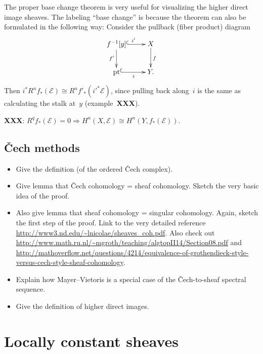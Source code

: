 \documentclass[10pt]{amsart}
\theoremstyle{definition}
\theoremstyle{plain}
\theoremstyle{remark}
\newcommand{\E}{\mathcal{E}}
\newcommand{\pt}{\mathrm{pt}}
\begin{document}
The proper base change theorem is very useful for visualizing the higher direct
image sheaves. The labeling ``base change'' is because the theorem can also be
formulated in the following way: Consider the pullback (fiber product) diagram
\[ \xymatrix{
  f^{-1}[y] \ar@{^{(}->}[r]^{i'} \ar[d]_{f'} & X \ar[d]^f \\
  \pt \ar@{^{(}->}[r]_i & Y.
} \]
Then $i^* R^n f_*(\E) \cong R^n f'_*(i'^*\E)$, since pulling back along~$i$ is
the same as calculating the stalk at~$y$ (example~\textbf{XXX}).

\textbf{XXX}: $R^q f_*(\E) = 0 \Rightarrow H^n(X,\E) \cong H^n(Y,f_*(\E))$.


\subsection{Čech methods}

\begin{itemize}
\item Give the definition (of the ordered Čech complex).
\item Give lemma that Čech cohomology = sheaf cohomology. Sketch the very basic
idea of the proof.
\item Also give lemma that sheaf cohomology = singular cohomology. Again,
sketch the first step of the proof. Link to the very detailed reference
\url{http://www3.nd.edu/~lnicolae/sheaves_coh.pdf}. Also check out
\url{http://www.math.ru.nl/~mgroth/teaching/algtopII14/Section08.pdf} and
\url{http://mathoverflow.net/questions/4214/equivalence-of-grothendieck-style-versus-cech-style-sheaf-cohomology}.
\item Explain how Mayer--Vietoris is a special case of the Čech-to-sheaf
spectral sequence.
\end{itemize}

\begin{itemize}
\item Give the definition of higher direct images.
\end{itemize}


\section*{Locally constant sheaves}
\end{document}
